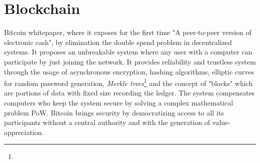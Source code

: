 \section{Blockchain}

Bitcoin whitepaper, where it exposes for the first time "A peer-to-peer version of electronic cash"\cite{nakamoto2008bitcoin}, by elimination the double spend problem in decentralized systems. It proposes an unbreakable system where any user with a computer can participate by just joining the network. It provides reliability and trustless system through the usage of asynchronous encryption, hashing algorithms, elliptic curves for random password generation, \emph{ Merkle trees}\footnote{} and the concept of "blocks" which are portions of data with fixed size recording the ledger. The system compensates computers who keep the system secure by solving a complex mathematical problem \ac{PoW}. Bitcoin brings security by democratizing access to all its participants without a central authority and with the generation of value-appreciation.